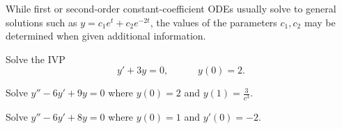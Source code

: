 
\begin{applicationActivities}

\begin{remark}
While first or second-order constant-coefficient ODEs usually
solve to general solutions such as \(y=c_1e^t+c_2e^{-2t}\),
the values of the parameters \(c_1,c_2\) may be determined
when given additional information.
\end{remark}

\begin{activity}{10}
Solve the IVP
\[y'+3y=0,\hspace{3em} y(0)=2.\]
\end{activity}

\begin{activity}{15}
Solve \(y''-6y'+9y=0\)
where \(y(0)=2\) and \(y(1)=\frac{3}{e^3}\).
\end{activity}

\begin{activity}{15}
Solve \(y''-6y'+8y=0\)
where \(y(0)=1\) and \(y'(0)=-2\).
\end{activity}




\end{applicationActivities}
